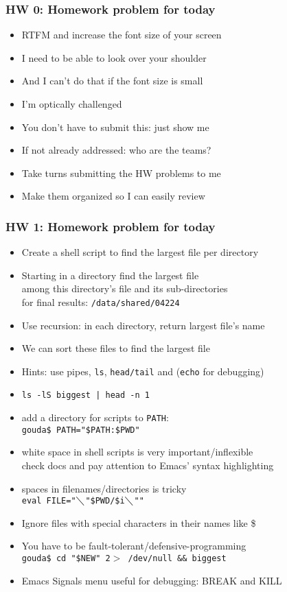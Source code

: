 \documentclass[11pt,pdftex,dvipsnames,usenames,helvetica]{beamer}
\begin{document}
\begin{frame}
\frametitle{HW 0: Homework problem for today}

\begin{itemize}
\item RTFM and increase the font size of your screen
\item I need to be able to look over your shoulder
\item And I can't do that if the font size is small
\item I'm optically challenged
\item You don't have to submit this: just show me
\item If not already addressed: who are the teams?
\item Take turns submitting the HW problems to me
\item Make them organized so I can easily review
\end{itemize}
\end{frame}

\begin{frame}
\frametitle{HW 1: Homework problem for today}

\begin{itemize}
\item Create a shell script to find the largest file per directory
\item Starting in a directory find the largest file\\
among this directory's file and its sub-directories\\
for final results: {\tt /data/shared/04224}
\item Use recursion: in each directory, return largest file's name 
\item We can sort these files to find the largest file
\item Hints: use pipes, {\tt ls}, {\tt head/tail} and ({\tt echo} for debugging) 
\item {\tt ls -lS \textasciigrave biggest\textasciigrave\ | head -n 1}
\item add a directory for scripts to {\tt PATH}:\\ 
{\tt gouda\$ PATH="\${PATH}:\${PWD}"}
\item white space in shell scripts is very important/inflexible\\
check docs and pay attention to Emacs' syntax highlighting 
\item spaces in filenames/directories is tricky\\ 
{\tt eval FILE="$\diagdown$"\$PWD/\$i$\diagdown$""}
\item Ignore files with special characters in their names like \$ 
\item You have to be fault-tolerant/defensive-programming \\
 {\tt gouda\$ cd "\$NEW" 2$>$ /dev/null \&\& biggest}
\item Emacs Signals menu useful for debugging: BREAK and KILL
\end{itemize}

\end{frame}
\end{document}
